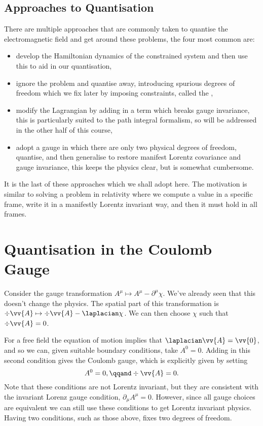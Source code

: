 \documentclass[fleqn]{NotesClass}
\begin{document}
    \subsection{Approaches to Quantisation}
    There are multiple approaches that are commonly taken to quantise the electromagnetic field and get around these problems, the four most common are:
    \begin{itemize}
        \item develop the Hamiltonian dynamics of the constrained system and then use this to aid in our quantisation,
        \item ignore the problem and quantise away, introducing spurious degrees of freedom which we fix later by imposing constraints, called the ,
        \item modify the Lagrangian by adding in a term which breaks gauge invariance, this is particularly suited to the path integral formalism, so will be addressed in the other half of this course, %
        \item adopt a gauge in which there are only two physical degrees of freedom, quantise, and then generalise to restore manifest Lorentz covariance and gauge invariance, this keeps the physics clear, but is somewhat cumbersome.
    \end{itemize}
    It is the last of these approaches which we shall adopt here.
    The motivation is similar to solving a problem in relativity where we compute a value in a specific frame, write it in a manifestly Lorentz invariant way, and then it must hold in all frames.
    
    \section{Quantisation in the Coulomb Gauge}
    Consider the gauge transformation \(A^\mu \mapsto A^\mu - \partial^\mu \chi\).
    We've already seen that this doesn't change the physics.
    The spatial part of this transformation is \(\div\vv{A} \mapsto \div\vv{A} - \laplacian\chi\).
    We can then choose \(\chi\) such that \(\div\vv{A} = 0\).
    
    For a free field the equation of motion implies that \(\laplacian\vv{A} = \vv{0}\), and so we can, given suitable boundary conditions, take \(A^0 = 0\).
    Adding in this second condition gives the Coulomb gauge, which is explicitly given by setting
    \begin{equation}
        A^0 = 0, \qqand \div\vv{A} = 0.
    \end{equation}
    Note that these conditions are not Lorentz invariant, but they are consistent with the invariant Lorenz gauge condition, \(\partial_\mu A^\mu = 0\).
    However, since all gauge choices are equivalent we can still use these conditions to get Lorentz invariant physics.
    Having two conditions, such as those above, fixes two degrees of freedom.
    
\end{document}
